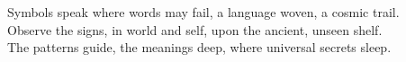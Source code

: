 \documentclass{article}
\begin{document}
\begin{infobox}
Symbols speak where words may fail, a language woven, a cosmic trail.\\
Observe the signs, in world and self, upon the ancient, unseen shelf.\\
The patterns guide, the meanings deep, where universal secrets sleep.
\end{infobox}
\end{document}
